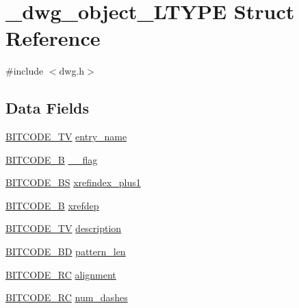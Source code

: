 \hypertarget{struct__dwg__object__LTYPE}{\section{\-\_\-dwg\-\_\-object\-\_\-\-L\-T\-Y\-P\-E \-Struct \-Reference}
\label{struct__dwg__object__LTYPE}
}


{\ttfamily \#include $<$dwg.\-h$>$}

\subsection*{\-Data \-Fields}
\begin{DoxyCompactItemize}
\item 
\hyperlink{dwg_8h_a2a7e040c6e36ca039b03608679ecaf7c}{\-B\-I\-T\-C\-O\-D\-E\-\_\-\-T\-V} \hyperlink{struct__dwg__object__LTYPE_a24438e73efdeccb4fd7c4e0c538ad22d}{entry\-\_\-name}
\item 
\hyperlink{dwg_8h_ab533b1f62d9086749e3bb5b67e9f224e}{\-B\-I\-T\-C\-O\-D\-E\-\_\-\-B} \hyperlink{struct__dwg__object__LTYPE_ae53b3e18f3777d304425f370a7b4e0dd}{\-\_\-\_\-flag}
\item 
\hyperlink{dwg_8h_a94297606fbd4a4ff97e8add284af0809}{\-B\-I\-T\-C\-O\-D\-E\-\_\-\-B\-S} \hyperlink{struct__dwg__object__LTYPE_afe48721c9af1ced8d9bb146d58aac5c4}{xrefindex\-\_\-plus1}
\item 
\hyperlink{dwg_8h_ab533b1f62d9086749e3bb5b67e9f224e}{\-B\-I\-T\-C\-O\-D\-E\-\_\-\-B} \hyperlink{struct__dwg__object__LTYPE_aca4cc4d1c08f02bef40fee719aa69411}{xrefdep}
\item 
\hyperlink{dwg_8h_a2a7e040c6e36ca039b03608679ecaf7c}{\-B\-I\-T\-C\-O\-D\-E\-\_\-\-T\-V} \hyperlink{struct__dwg__object__LTYPE_a8f6a2c2b4107826e3fe704808b2a9099}{description}
\item 
\hyperlink{dwg_8h_a3c1e6781466b74ba07785d57da70ed97}{\-B\-I\-T\-C\-O\-D\-E\-\_\-\-B\-D} \hyperlink{struct__dwg__object__LTYPE_a3e0cba94a047a7def1fcbb01c3e21c61}{pattern\-\_\-len}
\item 
\hyperlink{dwg_8h_a7fd199a8f9c9cc52bdab220f65a2a619}{\-B\-I\-T\-C\-O\-D\-E\-\_\-\-R\-C} \hyperlink{struct__dwg__object__LTYPE_a01c4e6f989423ee2bfe7a2c4fa18efd1}{alignment}
\item 
\hyperlink{dwg_8h_a7fd199a8f9c9cc52bdab220f65a2a619}{\-B\-I\-T\-C\-O\-D\-E\-\_\-\-R\-C} \hyperlink{struct__dwg__object__LTYPE_ab18bbf59bd4dc9830e7758587735a879}{num\-\_\-dashes}
\item 

\end{DoxyCompactItemize}
